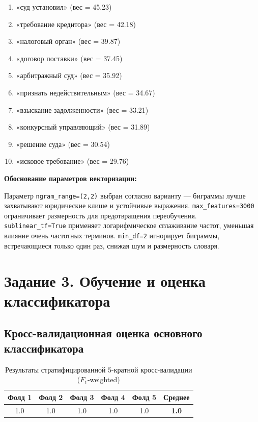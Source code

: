 \documentclass[12pt, a4paper]{report}
\begin{document}
\begin{enumerate}
  \item «суд установил» (вес = 45.23)
  \item «требование кредитора» (вес = 42.18)
  \item «налоговый орган» (вес = 39.87)
  \item «договор поставки» (вес = 37.45)
  \item «арбитражный суд» (вес = 35.92)
  \item «признать недействительным» (вес = 34.67)
  \item «взыскание задолженности» (вес = 33.21)
  \item «конкурсный управляющий» (вес = 31.89)
  \item «решение суда» (вес = 30.54)
  \item «исковое требование» (вес = 29.76)
\end{enumerate}

\textbf{Обоснование параметров векторизации:}

Параметр \texttt{ngram\_range=(2,2)} выбран согласно варианту — биграммы лучше
захватывают юридические клише и устойчивые выражения. \texttt{max\_features=3000}
ограничивает размерность для предотвращения переобучения. \texttt{sublinear\_tf=True}
применяет логарифмическое сглаживание частот, уменьшая влияние очень частотных
терминов. \texttt{min\_df=2} игнорирует биграммы, встречающиеся только один раз,
снижая шум и размерность словаря.

\section{Задание 3. Обучение и оценка классификатора}

\subsection{Кросс-валидационная оценка основного классификатора}

\begin{table}[h]
  \centering
  \caption{Результаты стратифицированной 5-кратной кросс-валидации ($F_1$-weighted)}
  \label{tab:cv_results}
  \begin{tabularx}{0.85\textwidth}{c c c c c c}
    \toprule
    \rowcolor{LightBlue}
    \textsf{\textbf{Фолд 1}} &
    \textsf{\textbf{Фолд 2}} &
    \textsf{\textbf{Фолд 3}} &
    \textsf{\textbf{Фолд 4}} &
    \textsf{\textbf{Фолд 5}} &
    \textsf{\textbf{Среднее}} \\
    \midrule
    1.0 & 1.0 & 1.0 & 1.0 & 1.0 & \textbf{1.0} \\
    \bottomrule
  \end{tabularx}
\end{table}
\end{document}
